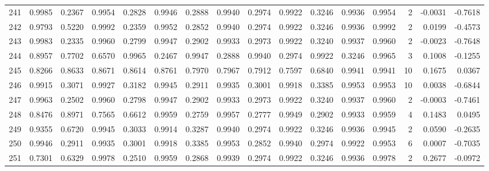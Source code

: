 \begin{tabular}{lrrrrrrrrrrrrrrr}
241 &      0.9985 &  0.2367 &  0.9954 &  0.2828 &  0.9946 &  0.2888 &  0.9940 &  0.2974 &  0.9922 &  0.3246 &   0.9936 &     0.9954 &      2 &                   -0.0031 &                    -0.7618 \\
242 &      0.9793 &  0.5220 &  0.9992 &  0.2359 &  0.9952 &  0.2852 &  0.9940 &  0.2974 &  0.9922 &  0.3246 &   0.9936 &     0.9992 &      2 &                    0.0199 &                    -0.4573 \\
243 &      0.9983 &  0.2335 &  0.9960 &  0.2799 &  0.9947 &  0.2902 &  0.9933 &  0.2973 &  0.9922 &  0.3240 &   0.9937 &     0.9960 &      2 &                   -0.0023 &                    -0.7648 \\
244 &      0.8957 &  0.7702 &  0.6570 &  0.9965 &  0.2467 &  0.9947 &  0.2888 &  0.9940 &  0.2974 &  0.9922 &   0.3246 &     0.9965 &      3 &                    0.1008 &                    -0.1255 \\
245 &      0.8266 &  0.8633 &  0.8671 &  0.8614 &  0.8761 &  0.7970 &  0.7967 &  0.7912 &  0.7597 &  0.6840 &   0.9941 &     0.9941 &     10 &                    0.1675 &                     0.0367 \\
246 &      0.9915 &  0.3071 &  0.9927 &  0.3182 &  0.9945 &  0.2911 &  0.9935 &  0.3001 &  0.9918 &  0.3385 &   0.9953 &     0.9953 &     10 &                    0.0038 &                    -0.6844 \\
247 &      0.9963 &  0.2502 &  0.9960 &  0.2798 &  0.9947 &  0.2902 &  0.9933 &  0.2973 &  0.9922 &  0.3240 &   0.9937 &     0.9960 &      2 &                   -0.0003 &                    -0.7461 \\
248 &      0.8476 &  0.8971 &  0.7565 &  0.6612 &  0.9959 &  0.2759 &  0.9957 &  0.2777 &  0.9949 &  0.2902 &   0.9933 &     0.9959 &      4 &                    0.1483 &                     0.0495 \\
249 &      0.9355 &  0.6720 &  0.9945 &  0.3033 &  0.9914 &  0.3287 &  0.9940 &  0.2974 &  0.9922 &  0.3246 &   0.9936 &     0.9945 &      2 &                    0.0590 &                    -0.2635 \\
250 &      0.9946 &  0.2911 &  0.9935 &  0.3001 &  0.9918 &  0.3385 &  0.9953 &  0.2852 &  0.9940 &  0.2974 &   0.9922 &     0.9953 &      6 &                    0.0007 &                    -0.7035 \\
251 &      0.7301 &  0.6329 &  0.9978 &  0.2510 &  0.9959 &  0.2868 &  0.9939 &  0.2974 &  0.9922 &  0.3246 &   0.9936 &     0.9978 &      2 &                    0.2677 &                    -0.0972 \\

\end{tabular}
